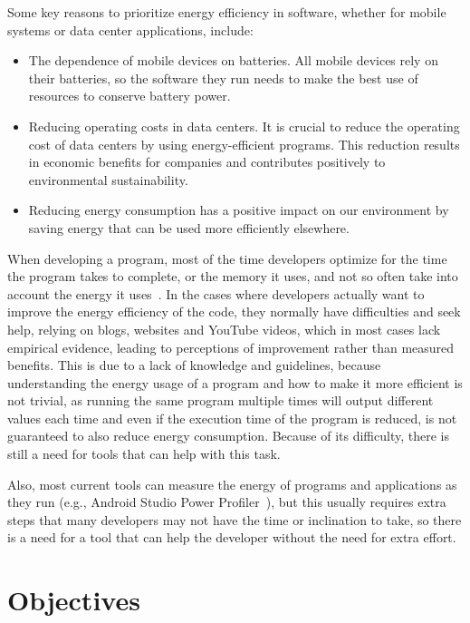 Some key reasons to prioritize energy efficiency in software, whether for mobile systems or data center applications, include:

\begin{itemize}
  \item The dependence of mobile devices on batteries. All mobile devices rely on their batteries, so the software they run needs to make the best use of resources to conserve battery power.
  \item Reducing operating costs in data centers. It is crucial to reduce the operating cost of data centers by using energy-efficient programs. This reduction results in economic benefits for companies and contributes positively to environmental sustainability. 
  \item Reducing energy consumption has a positive impact on our environment by saving energy that can be used more efficiently elsewhere. 
\end{itemize}

When developing a program, most of the time developers optimize for the time the program takes to complete, or the memory it uses, and not so often take into account the energy it uses~\cite{10.1145/1666420.1666438}. 
In the cases where developers actually want to improve the energy efficiency of the code, they normally have difficulties and seek help, relying on blogs, websites and YouTube videos, which in most cases lack empirical evidence, leading to perceptions of improvement rather than measured benefits\cite{10.1145/3154384}. This is due to a lack of knowledge and guidelines, because understanding the energy usage of a program and how to make it more efficient is not trivial, as running the same program multiple times will output different values each time and even if the execution time of the program is reduced, is not guaranteed to also reduce energy consumption. Because of its difficulty, there is still a need for tools that can help with this task\cite{10.1145/2597073.2597110}. 

Also, most current tools can measure the energy of programs and applications as they run (e.g., Android Studio Power Profiler~\cite{android_power_profiler}), but this usually requires extra steps that many developers may not have the time or inclination to take, so there is a need for a tool that can help the developer without the need for extra effort\cite{10.1145/3154384}.

\section{Objectives}

